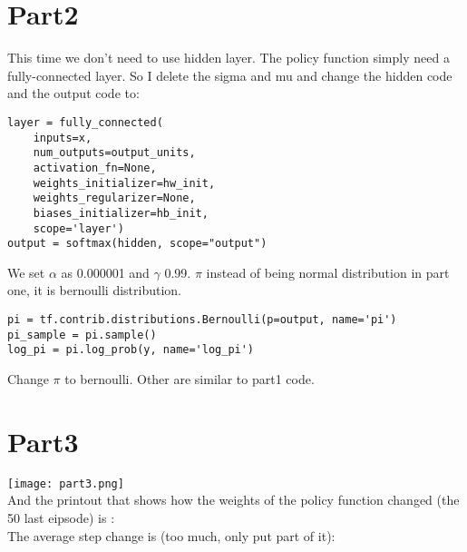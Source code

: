 \documentclass{article}
\begin{document}
\section{Part2}
This time we don't need to use hidden layer. The policy function simply need a fully-connected layer. So I delete the sigma and mu and change the hidden code and the output code to:\\ 
\begin{verbatim}
layer = fully_connected(
    inputs=x,
    num_outputs=output_units,
    activation_fn=None,
    weights_initializer=hw_init,
    weights_regularizer=None,
    biases_initializer=hb_init,
    scope='layer') 
output = softmax(hidden, scope="output")
\end{verbatim}   
We set $\alpha$ as  0.000001 and $\gamma$ 0.99.  $\pi$ instead of being normal distribution in part one, it is bernoulli distribution.

\begin{verbatim}
pi = tf.contrib.distributions.Bernoulli(p=output, name='pi')
pi_sample = pi.sample()
log_pi = pi.log_prob(y, name='log_pi')
\end{verbatim} 
Change  $\pi$ to  bernoulli.
Other are similar to  part1 code.
\section{Part3}
\texttt{[image: part3.png]}\\
And the printout that shows how the weights of the policy function changed (the 50 last eipsode) is :\\


The  average step change is (too much, only put part of it):\\
\end{document}
